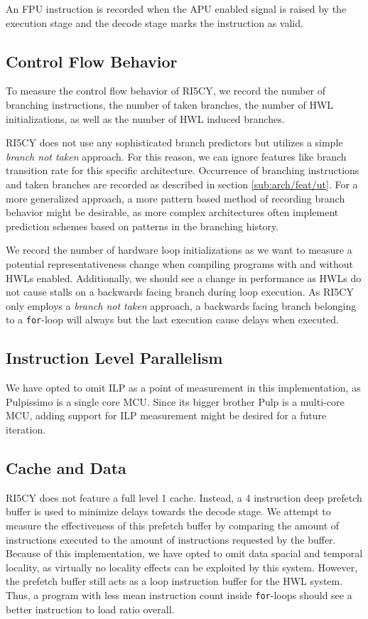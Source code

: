 \documentclass[../bachelor_paper.tex]{subfiles}
\begin{document}
An \ac{FPU} instruction is recorded when the \ac{APU} enabled signal is raised by the execution stage and the decode stage marks the instruction as valid.

\subsection{Control Flow Behavior}
    \label{sub:arch/feat/ctrl}
To measure the control flow behavior of RI5CY, we record the number of branching instructions, the number of taken branches, the number of \ac{HWL} initializations, as well as the number of \ac{HWL} induced branches.

RI5CY does not use any sophisticated branch predictors but utilizes a simple \emph{branch not taken} approach. For this reason, we can ignore features like branch transition rate \cite{haungsBranchTransitionRate2000} for this specific architecture. Occurrence of branching instructions and taken branches are recorded as described in section \ref{sub:arch/feat/ut}. For a more generalized approach, a more pattern based method of recording branch behavior might be desirable, as more complex architectures often implement prediction schemes based on patterns in the branching history.

We record the number of hardware loop initializations as we want to measure a potential representativeness change when compiling programs with and without \acp{HWL} enabled. Additionally, we should see a change in performance as \acp{HWL} do not cause stalls on a backwards facing branch during loop execution. As RI5CY only employs a \emph{branch not taken} approach, a backwards facing branch belonging to a \texttt{for}-loop will always but the last execution cause delays when executed.

\subsection{Instruction Level Parallelism}
We have opted to omit \ac{ILP} as a point of measurement in this implementation, as Pulpissimo is a single core \ac{MCU}. Since its bigger brother Pulp \cite{pulliniMrWolfEnergyPrecision2019} is a multi-core \ac{MCU}, adding support for \ac{ILP} measurement might be desired for a future iteration.

\subsection{Cache and Data}
RI5CY does not feature a full level 1 cache. Instead, a 4 instruction deep prefetch buffer is used to minimize delays towards the decode stage. We attempt to measure the effectiveness of this prefetch buffer by comparing the amount of instructions executed to the amount of instructions requested by the buffer. Because of this implementation, we have opted to omit data spacial and temporal locality, as virtually no locality effects can be exploited by this system. However, the prefetch buffer still acts as a loop instruction buffer for the \ac{HWL} system. Thus, a program with less mean instruction count inside \texttt{for}-loops should see a better instruction to load ratio overall.
\end{document}
